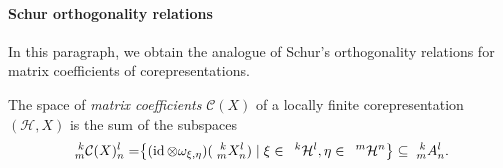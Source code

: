 \paragraph{Schur orthogonality relations}
In this paragraph, we obtain the analogue of Schur's orthogonality
relations for matrix coefficients of corepresentations.

The space of \emph{matrix coefficients} $\mathcal{C}(X)$ of a locally
finite corepresentation $(\mathcal{H},X)$ is the sum of
the subspaces
\begin{align*}
  \Gr{\mathcal{C}(X)}{k}{l}{m}{n} &= \span \left\{ (\id \otimes
  \omega_{\xi,\eta})(\Gr{X}{k}{l}{m}{n}) \mid \xi \in
  \Gru{\mathcal{H}}{k}{l}, \eta \in \Gru{\mathcal{H}}{m}{n} \right\}
\subseteq \Gr{A}{k}{l}{m}{n}.
\end{align*}

